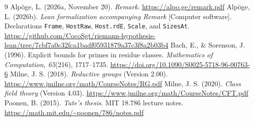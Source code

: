 \documentclass[11pt]{article}
\theoremstyle{remark}\newtheorem{remark}[theorem]{Remark}
\begin{document}
\begin{thebibliography}{9}
Alp\"oge, L. (2026a, November 20). \emph{Remark}.
\url{https://alpo.ge/remark.pdf}
Alp\"oge, L. (2026b). \emph{Lean formalization accompanying Remark}
[Computer software]. Declarations \texttt{Frame}, \texttt{HostRaw},
\texttt{Host.rdE}, \texttt{Scale}, and \texttt{SizesAt}.
\url{https://github.com/CocoSgt/riemann-hypothesis-lean/tree/7cbf7a0c32fca1badf05931879a37c3f8a2b03b4}
Bach, E., \& Sorenson, J. (1996). Explicit bounds for primes in
residue classes. \emph{Mathematics of Computation, 65}(216),
1717--1735. \url{https://doi.org/10.1090/S0025-5718-96-00763-6}
Milne, J. S. (2018). \emph{Reductive groups} (Version 2.00).
\url{https://www.jmilne.org/math/CourseNotes/RG.pdf}
Milne, J. S. (2020). \emph{Class field theory} (Version 4.03).
\url{https://www.jmilne.org/math/CourseNotes/CFT.pdf}
Poonen, B. (2015). \emph{Tate's thesis}. MIT 18.786 lecture notes.
\url{https://math.mit.edu/~poonen/786/notes.pdf}
\end{thebibliography}
\end{document}
